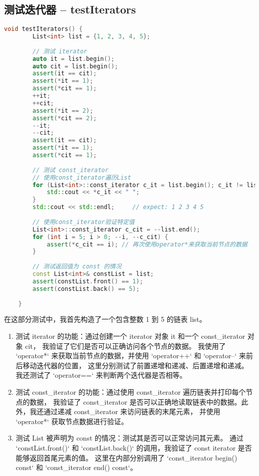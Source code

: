 \documentclass[UTF8]{ctexart}
\begin{document}
\subsection{测试迭代器 -- testIterators}
\begin{lstlisting}[language=c++, breaklines=true, keywordstyle=\color{blue!70}, commentstyle=\color{red!50!green!50!blue!50}, frame=shadowbox, rulesepcolor=\color{red!20!green!20!blue!20}]
    void testIterators() {
        List<int> list = {1, 2, 3, 4, 5};
    
        // 测试 iterator
        auto it = list.begin();
        auto cit = list.begin();
        assert(it == cit);
        assert(*it == 1);
        assert(*cit == 1);
        ++it;
        ++cit;
        assert(*it == 2);
        assert(*cit == 2);
        --it;
        --cit;
        assert(it == cit);
        assert(*it == 1);
        assert(*cit == 1);
    
        // 测试 const_iterator
        // 使用const_iterator遍历List
        for (List<int>::const_iterator c_it = list.begin(); c_it != list.end(); ++c_it) {
            std::cout << *c_it << " "; 
        }
        std::cout << std::endl;     // expect: 1 2 3 4 5
        
        // 使用const_iterator验证特定值
        List<int>::const_iterator c_cit = --list.end();
        for (int i = 5; i > 0; --i, --c_cit) {
            assert(*c_cit == i); // 再次使用operator*来获取当前节点的数据
        }
    
        // 测试返回值为 const 的情况
        const List<int>& constList = list;
        assert(constList.front() == 1);
        assert(constList.back() == 5);
    
    }
\end{lstlisting}

在这部分测试中，我首先构造了一个包含整数 1 到 5 的链表 list。

\begin{enumerate}
    \item 测试 iterator 的功能：通过创建一个 iterator 对象 it 和一个 const\_iterator 对象 cit，
我验证了它们是否可以正确访问各个节点的数据。
我使用了 `operator*` 来获取当前节点的数据，并使用 `operator++` 和 `operator--` 来前后移动迭代器的位置，
这里分别测试了前置递增和递减、后置递增和递减。
我还测试了 `operator==` 来判断两个迭代器是否相等。

    \item 测试 const\_iterator 的功能：通过使用 const\_iterator 遍历链表并打印每个节点的数据，
我验证了 const\_iterator 是否可以正确地读取链表中的数据。此外，我还通过递减 const\_iterator 来访问链表的末尾元素，
并使用 `operator*` 获取节点数据进行验证。

    \item 测试 List 被声明为 const 的情况：测试其是否可以正常访问其元素。
通过 `constList.front()` 和 `constList.back()` 的调用，我验证了 const iterator 是否能够返回首尾元素的值。
这里在内部分别调用了 `const\_iterator begin() const` 和 `const\_iterator end() const`。
\end{enumerate}
\end{document}
